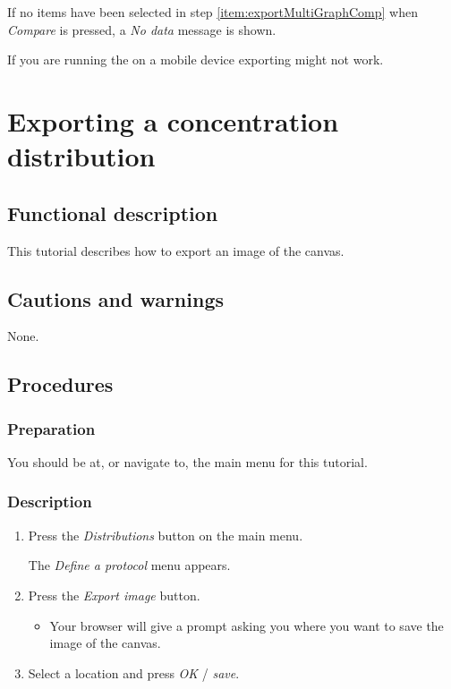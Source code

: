 If no items have been selected in step \ref{item:exportMultiGraphComp} when \emph{Compare} is pressed, a \emph{No data} message is shown.

If you are running the \applicationname on a mobile device exporting might not work.


\section{Exporting a concentration distribution}
\label{sec:exportDist}

\subsection{Functional description}
This tutorial describes how to export an image of the canvas.

\subsection{Cautions and warnings}
None.

\subsection{Procedures}
\subsubsection{Preparation}
You should be at, or navigate to, the main menu for this tutorial.

\subsubsection{Description}
\begin{enumerate}
	\item Press the \emph{Distributions} button on the main menu.
		\begin{itemize}
            The \emph{Define a protocol} menu appears.
		\end{itemize}
	\item Press the \emph{Export image} button.
		\begin{itemize}
            \item Your browser will give a prompt asking you where you want to save the image of the canvas.
		\end{itemize}
	\item  Select a location and press \emph{OK} / \emph{save}.
\end{enumerate}

